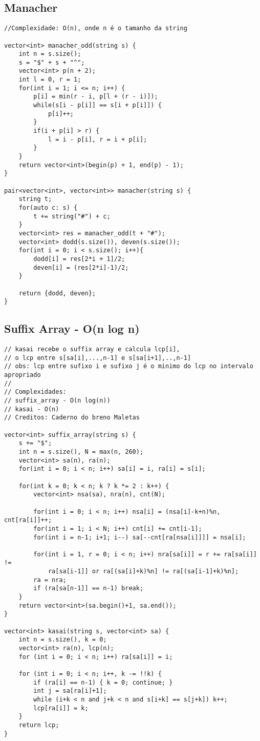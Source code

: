 \documentclass[11pt, a4paper, twoside]{article}
\begin{document}
\subsection{Manacher}
\begin{verbatim}
//Complexidade: O(n), onde n é o tamanho da string

vector<int> manacher_odd(string s) {
    int n = s.size();
    s = "$" + s + "^";
    vector<int> p(n + 2);
    int l = 0, r = 1;
    for(int i = 1; i <= n; i++) {
        p[i] = min(r - i, p[l + (r - i)]);
        while(s[i - p[i]] == s[i + p[i]]) {
            p[i]++;
        }
        if(i + p[i] > r) {
            l = i - p[i], r = i + p[i];
        }
    }
    return vector<int>(begin(p) + 1, end(p) - 1);
}

pair<vector<int>, vector<int>> manacher(string s) {
    string t;
    for(auto c: s) {
        t += string("#") + c;
    }
    vector<int> res = manacher_odd(t + "#");
    vector<int> dodd(s.size()), deven(s.size());
    for(int i = 0; i < s.size(); i++){
        dodd[i] = res[2*i + 1]/2;
        deven[i] = (res[2*i]-1)/2;
    }
    
    return {dodd, deven};
}
\end{verbatim}

\subsection{Suffix Array - O(n log n)}
\begin{verbatim}
// kasai recebe o suffix array e calcula lcp[i],
// o lcp entre s[sa[i],...,n-1] e s[sa[i+1],..,n-1]
// obs: lcp entre sufixo i e sufixo j é o minimo do lcp no intervalo apropriado
//
// Complexidades:
// suffix_array - O(n log(n))
// kasai - O(n)
// Creditos: Caderno do breno Maletas

vector<int> suffix_array(string s) {
	s += "$";
	int n = s.size(), N = max(n, 260);
	vector<int> sa(n), ra(n);
	for(int i = 0; i < n; i++) sa[i] = i, ra[i] = s[i];
    
	for(int k = 0; k < n; k ? k *= 2 : k++) {
		vector<int> nsa(sa), nra(n), cnt(N);
    
		for(int i = 0; i < n; i++) nsa[i] = (nsa[i]-k+n)%n, cnt[ra[i]]++;
		for(int i = 1; i < N; i++) cnt[i] += cnt[i-1];
		for(int i = n-1; i+1; i--) sa[--cnt[ra[nsa[i]]]] = nsa[i];
    
		for(int i = 1, r = 0; i < n; i++) nra[sa[i]] = r += ra[sa[i]] !=
			ra[sa[i-1]] or ra[(sa[i]+k)%n] != ra[(sa[i-1]+k)%n];
		ra = nra;
		if (ra[sa[n-1]] == n-1) break;
	}
	return vector<int>(sa.begin()+1, sa.end());
}

vector<int> kasai(string s, vector<int> sa) {
	int n = s.size(), k = 0;
	vector<int> ra(n), lcp(n);
	for (int i = 0; i < n; i++) ra[sa[i]] = i;
    
	for (int i = 0; i < n; i++, k -= !!k) {
		if (ra[i] == n-1) { k = 0; continue; }
		int j = sa[ra[i]+1];
		while (i+k < n and j+k < n and s[i+k] == s[j+k]) k++;
		lcp[ra[i]] = k;
	}
	return lcp;
}
\end{verbatim}
\end{document}
